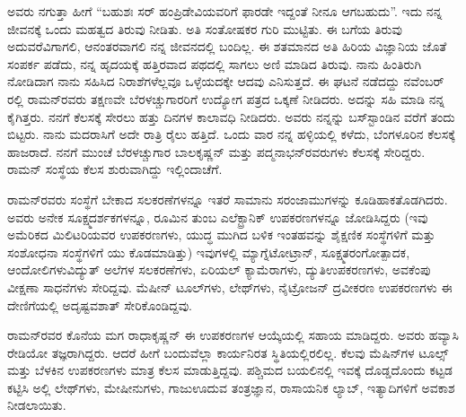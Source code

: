 ಅವರು ನಗುತ್ತಾ ಹೀಗೆ “ಬಹುಶಃ ಸರ್ ಹಂಪ್ರಿಡೇವಿಯವರಿಗೆ ಫಾರಡೇ ಇದ್ದಂತೆ ನೀನೂ ಆಗಬಹುದು”. ಇದು ನನ್ನ ಜೀವನಕ್ಕೆ ಒಂದು ಮಹತ್ವದ ತಿರುವು ನೀಡಿತು. ಅತಿ ಸಂತೋಷಕರ ಗುರಿ ಮುಟ್ಟಿತು. ಈ ಬಗೆಯ ತಿರುವು ಅದುವರೆವಿಗಾಗಲಿ, ಆನಂತರವಾಗಲಿ ನನ್ನ ಜೀವನದಲ್ಲಿ ಬಂದಿಲ್ಲ. ಈ ಶತಮಾನದ ಅತಿ ಹಿರಿಯ ವಿಜ್ಞಾನಿಯ ಜೊತೆ ಸಂಪರ್ಕ ಪಡೆದು, ನನ್ನ ಹೃದಯಕ್ಕೆ ಹತ್ತಿರವಾದ ಪಥದಲ್ಲಿ ಸಾಗಲು ಅಣಿ ಮಾಡಿದ ತಿರುವು. ನಾನು ಹಿಂತಿರುಗಿ ನೋಡಿದಾಗ ನಾನು ಸಹಿಸಿದ ನಿರಾಶೆಗಳೆಲ್ಲವೂ ಒಳ್ಳೆಯದಕ್ಕೇ ಆದವು ಎನಿಸುತ್ತದೆ. ಈ ಘಟನೆ ನಡೆದದ್ದು ನವೆಂಬರ್ ರಲ್ಲಿ ರಾಮನ್‍ರವರು ತಕ್ಷಣವೇ ಬೆರಳಚ್ಚುಗಾರರಿಗೆ ಉದ್ಯೋಗ ಪತ್ರದ ಒಕ್ಕಣೆ ನೀಡಿದರು. ಅದನ್ನು ಸಹಿ ಮಾಡಿ ನನ್ನ ಕೈಗಿತ್ತರು. ನನಗೆ ಕೆಲಸಕ್ಕೆ ಸೇರಲು ಹತ್ತು ದಿನಗಳ ಕಾಲಾವಧಿ ನೀಡಿದರು. ಅವರು ನನ್ನನ್ನು ಬಸ್‍ಸ್ಟಾಂಡಿನ ವರೆಗೆ ತಂದು ಬಿಟ್ಟರು. ನಾನು ಮದರಾಸಿಗೆ ಅದೇ ರಾತ್ರಿ ರೈಲು ಹತ್ತಿದೆ. ಒಂದು ವಾರ ನನ್ನ ಹಳ್ಳಿಯಲ್ಲಿ ಕಳೆದು, ಬೆಂಗಳೂರಿನ ಕೆಲಸಕ್ಕೆ ಹಾಜರಾದೆ. ನನಗೆ ಮುಂಚೆ ಬೆರಳಚ್ಚುಗಾರ ಬಾಲಕೃಷ್ಣನ್ ಮತ್ತು ಪದ್ಮನಾಭನ್‍ರವರುಗಳು ಕೆಲಸಕ್ಕೆ ಸೇರಿದ್ದರು. ರಾಮನ್ ಸಂಸ್ಥೆಯ ಕೆಲಸ ಶುರುವಾಗಿದ್ದು ಇಲ್ಲಿಂದಾಚೆಗೆ.

ರಾಮನ್‍ರವರು ಸಂಸ್ಥೆಗೆ ಬೇಕಾದ ಸಲಕರಣೆಗಳನ್ನೂ ಇತರೆ ಸಾಮಾನು ಸರಂಜಾಮುಗಳನ್ನು ಕೂಡಿಹಾಕತೊಡಗಿದರು. ಅವರು ಅನೇಕ ಸೂಕ್ಷ್ಮದರ್ಶಕಗಳನ್ನೂ, ರೂಮಿನ ತುಂಬ ಎಲೆಕ್ಟ್ರಾನಿಕ್ ಉಪಕರಣಗಳನ್ನೂ ಜೋಡಿಸಿದ್ದರು (ಇವು ಅಮೆರಿಕದ ಮಿಲಿಟರಿಯವರ ಉಪಕರಣಗಳು, ಯುದ್ಧ ಮುಗಿದ ಬಳಿಕ ಇಂತಹವನ್ನು ಶೈಕ್ಷಣಿಕ ಸಂಸ್ಥೆಗಳಿಗೆ ಮತ್ತು ಸಂಶೋಧನಾ ಸಂಸ್ಥೆಗಳಿಗೆ ಯು ಕೊಡಮಾಡಿತ್ತು) ಇವುಗಳಲ್ಲಿ ಮ್ಯಾಗ್ನೆಟೋಟ್ರಾನ್, ಸೂಕ್ಷ್ಮತರಂಗೋತ್ಪಾದಕ, ಆಂದೋಲಿಗಳು\break ವಿದ್ಯುತ್ ಅಲೆಗಳ ಸಲಕರಣೆಗಳು, ಏರಿಯಲ್ ಕ್ಯಾಮೆರಾಗಳು, ದ್ಯುತಿಉಪಕರಣಗಳು, ಅವಕೆಂಪು ವೀಕ್ಷಣಾ ಸಾಧನೆಗಳು ಸೇರಿದ್ದವು. ಮೆಷೀನ್ ಟೂಲ್‍ಗಳು, ಲೇಥ್‍ಗಳು, ನೈಟ್ರೋಜನ್ ದ್ರವೀಕರಣ ಉಪಕರಣಗಳು ಈ ದೇಣಿಗೆಯಲ್ಲಿ ಅದೃಷ್ಟವಶಾತ್ ಸೇರಿಕೊಂಡಿದ್ದವು.

ರಾಮನ್‍ರವರ ಕೊನೆಯ ಮಗ ರಾಧಾಕೃಷ್ಣನ್ ಈ ಉಪಕರಣಗಳ ಆಯ್ಕೆಯಲ್ಲಿ ಸಹಾಯ ಮಾಡಿದ್ದರು. ಅವರು ಹವ್ಯಾಸಿ ರೇಡಿಯೋ ತಜ್ಞರಾಗಿದ್ದರು. ಆದರೆ ಹೀಗೆ ಬಂದುವೆಲ್ಲಾ ಕಾರ್ಯನಿರತ ಸ್ಥಿತಿಯಲ್ಲಿರಲಿಲ್ಲ. ಕೆಲವು ಮೆಷಿನ್‍ಗಳ ಟೂಲ್ಸ್ ಮತ್ತು ಬೆಳಕಿನ ಉಪಕರಣಗಳು ಮಾತ್ರ ಕೆಲಸ ಮಾಡುತ್ತಿದ್ದವು. ಪಶ್ಚಿಮದ ಬಯಲಿನಲ್ಲಿ ಇವಕ್ಕೆ ದೊಡ್ಡದೊಂದು ಕಟ್ಟಡ ಕಟ್ಟಿಸಿ ಅಲ್ಲಿ ಲೇಥ್‍ಗಳು, ಮೇಷೀನುಗಳು, ಗಾಜುಊದುವ ತಂತ್ರಜ್ಞಾನ, ರಾಸಾಯನಿಕ ಲ್ಯಾಬ್, ಇತ್ಯಾದಿಗಳಿಗೆ ಅವಕಾಶ ನೀಡಲಾಯಿತು.

